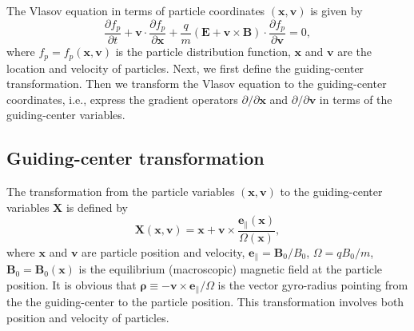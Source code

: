 \documentclass{article}
\newcommand{\tmmathbf}[1]{\ensuremath{\boldsymbol{#1}}}
\begin{document}
The Vlasov equation in terms of particle coordinates $(\mathbf{x},
\mathbf{v})$ is given by
\begin{equation}
  \frac{\partial f_p}{\partial t} +\mathbf{v} \cdot \frac{\partial
  f_p}{\partial \mathbf{x}} + \frac{q}{m} (\mathbf{E}+\mathbf{v} \times
  \mathbf{B}) \cdot \frac{\partial f_p}{\partial \mathbf{v}} = 0,
\end{equation}
where $f_p = f_p (\mathbf{x}, \mathbf{v})$ is the particle distribution
function, $\mathbf{x}$ and $\mathbf{v}$ are the location and velocity of
particles. Next, we first define the guiding-center transformation. Then we
transform the Vlasov equation to the guiding-center coordinates, i.e., express
the gradient operators $\partial / \partial \mathbf{x}$ and $\partial /
\partial \mathbf{v}$ in terms of the guiding-center variables.

\subsection{Guiding-center transformation}

The transformation from the particle variables $(\mathbf{x}, \mathbf{v})$ to
the guiding-center variables $\mathbf{X}$ is defined by{\cite{Catto1978}}
\begin{equation}
  \label{16-9-21-1} \mathbf{X} (\mathbf{x}, \mathbf{v}) =\mathbf{x}+\mathbf{v}
  \times \frac{\tmmathbf{e}_{\parallel} (\mathbf{x})}{\Omega (\mathbf{x})},
\end{equation}
where $\mathbf{x}$ and $\mathbf{v}$ are particle position and velocity,
$\tmmathbf{e}_{\parallel} =\mathbf{B}_0 / B_0$, $\Omega = q B_0 / m$,
$\mathbf{B}_0 =\mathbf{B}_0 (\mathbf{x})$ is the equilibrium (macroscopic)
magnetic field at the particle position. It is obvious that $\tmmathbf{\rho}
\equiv -\mathbf{v} \times \mathbf{e}_{\parallel} / \Omega$ is the vector
gyro-radius pointing from the the guiding-center to the particle position.
This transformation involves both position and velocity of particles.
\end{document}
